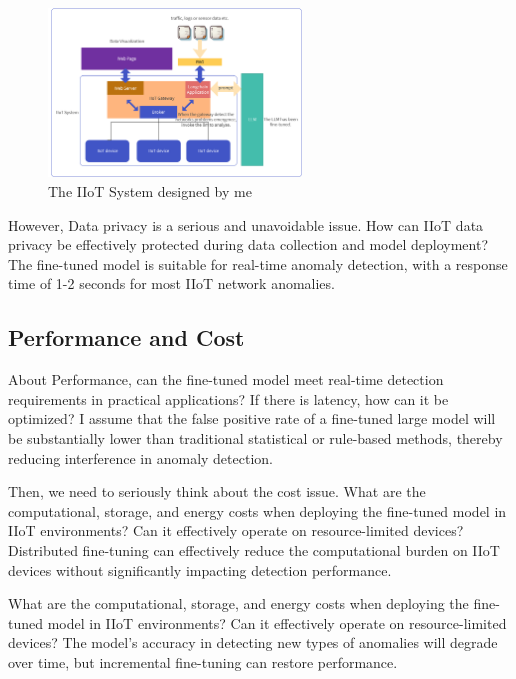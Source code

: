 \documentclass[usenatbib]{tjaa}
\begin{document}
\begin{figure} %
  \includegraphics[width=0.6\textwidth]{./img/my_iiot_system.jpg} %
  \caption{The IIoT System designed by me}
  \label{fig:fsmProcedure}
\end{figure}

However, Data privacy is a serious and unavoidable issue.
How can IIoT data privacy be effectively protected
during data collection and model deployment?
The fine-tuned model is suitable for real-time anomaly detection,
with a response time of 1-2 seconds for most IIoT network anomalies.

\subsection{Performance and Cost}
About Performance, can the fine-tuned model meet real-time detection requirements
in practical applications? If there is latency,
how can it be optimized?
I assume that the false positive rate of a fine-tuned large model will be
substantially lower than traditional statistical or rule-based methods,
thereby reducing interference in anomaly detection.

Then, we need to seriously think about the cost issue.
What are the computational, storage, and energy costs when deploying
the fine-tuned model in IIoT environments?
Can it effectively operate on resource-limited devices?
Distributed fine-tuning can effectively reduce the computational
burden on IIoT devices without significantly impacting
detection performance.

What are the computational, storage, and energy costs when
deploying the fine-tuned model in IIoT environments?
Can it effectively operate on resource-limited devices?
The model’s accuracy in detecting new types of anomalies will degrade over time,
but incremental fine-tuning can restore performance.
\end{document}
